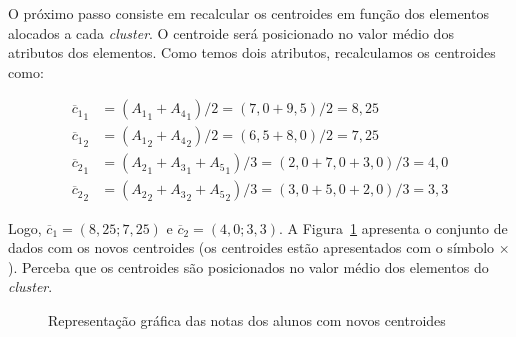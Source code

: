 O próximo passo consiste em recalcular os centroides em função dos elementos alocados a cada \textit{cluster}. O centroide será posicionado no valor médio dos atributos dos elementos. Como temos dois atributos, recalculamos os centroides como:

\begin{align*}
{\overline{c}_1}_1 &= ({A_1}_1 + {A_4}_1)/2 = (7,0 + 9,5)/2 = 8,25 \\
{\overline{c}_1}_2 &= ({A_1}_2 + {A_4}_2)/2 = (6,5 + 8,0)/2 = 7,25 \\
{\overline{c}_2}_1 &= ({A_2}_1 + {A_3}_1 + {A_5}_1)/3 = (2,0 + 7,0 + 3,0)/3 = 4,0 \\
{\overline{c}_2}_2 &= ({A_2}_2 + {A_3}_2 + {A_5}_2)/3 = (3,0 + 5,0 + 2,0)/3 = 3,3
\end{align*}

Logo, $\overline{c}_1 = (8,25; 7,25)$ e $\overline{c}_2 = (4,0; 3,3)$. A Figura~\ref{fig:dados-notas-alunos-novos-centroides} apresenta o conjunto de dados com os novos centroides (os centroides estão apresentados com o símbolo $\times$). Perceba que os centroides são posicionados no valor médio dos elementos do \textit{cluster}.

\begin{figure}[h]
	\centering
	
	
	
	\caption{Representação gráfica das notas dos alunos com novos centroides}
	\label{fig:dados-notas-alunos-novos-centroides}
\end{figure}

